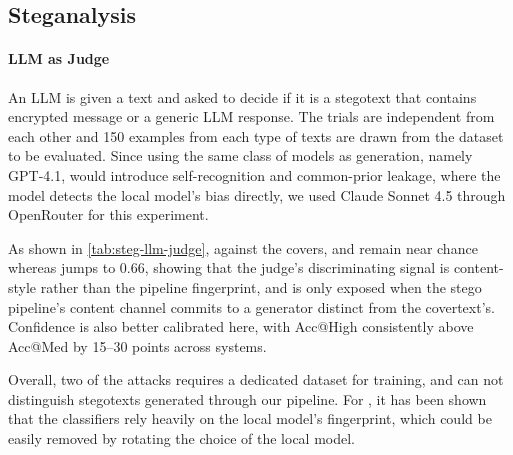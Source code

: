 \subsection{Steganalysis}
\label{app:subsec:steganalysis}

%

\paragraph{LLM as Judge}
An LLM is given a text and asked to decide if it is a stegotext that contains encrypted message or a generic LLM response. The trials are independent from each other and 150 examples from each type of texts are drawn from the dataset to be evaluated. Since using the same class of models as generation, namely GPT-4.1, would introduce self-recognition and common-prior leakage, where the model detects the local model's bias directly, we used Claude Sonnet 4.5 through OpenRouter for this experiment.


 
 As shown in \autoref{tab:steg-llm-judge}, against the covers, \qa and \lr remain near chance whereas \sg jumps to 0.66, showing that the judge's discriminating signal is content-style rather than the pipeline fingerprint, and is only exposed when the stego pipeline's content channel commits to a generator distinct from the covertext's. Confidence is also better calibrated here, with Acc@High consistently above Acc@Med by 15--30 points across systems. 

Overall, two of the attacks requires a dedicated dataset for training, and can not distinguish stegotexts generated through our pipeline. For \sg, it has been shown that the classifiers rely heavily on the local model's fingerprint, which could be easily removed by rotating the choice of the local model.

